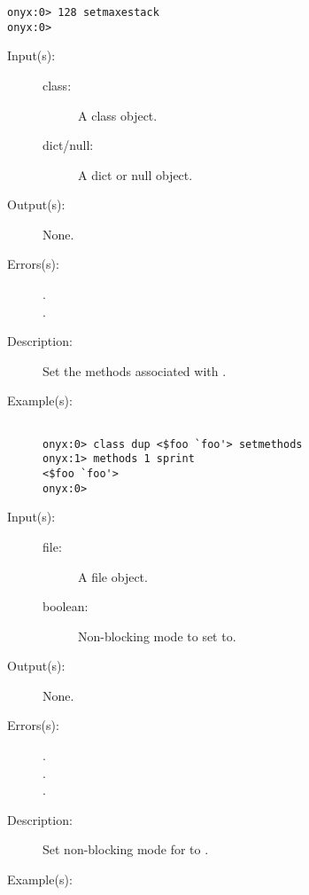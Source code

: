 \begin{description}
\begin{description}
\begin{verbatim}
onyx:0> 128 setmaxestack
onyx:0>
		\end{verbatim}
	\end{description}
\label{systemdict:setmethods}
\item[{\onyxop{class dict/null}{setmethods}{--}}: ]
	\begin{description}\item[]
	\item[Input(s): ]
		\begin{description}\item[]
		\item[class: ]
			A class object.
		\item[dict/null: ]
			A dict or null object.
		\end{description}
	\item[Output(s): ] None.
	\item[Errors(s): ]
		\begin{description}\item[]
		\item[.]
		\item[.]
		\end{description}
	\item[Description: ]
		Set the methods associated with .
	\item[Example(s): ]\begin{verbatim}

onyx:0> class dup <$foo `foo'> setmethods
onyx:1> methods 1 sprint
<$foo `foo'>
onyx:0>
		\end{verbatim}
	\end{description}
\label{systemdict:setnonblocking}
\item[{\onyxop{file boolean}{setnonblocking}{--}}: ]
	\begin{description}\item[]
	\item[Input(s): ]
		\begin{description}\item[]
		\item[file: ]
			A file object.
		\item[boolean: ]
			Non-blocking mode to set  to.
		\end{description}
	\item[Output(s): ] None.
	\item[Errors(s): ]
		\begin{description}\item[]
		\item[.]
		\item[.]
		\item[.]
		\end{description}
	\item[Description: ]
		Set non-blocking mode for  to .
	\item[Example(s): ]\begin{verbatim}


\end{verbatim}
\end{description}
\end{description}
